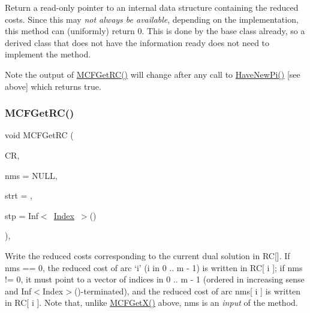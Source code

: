 Return a read-\/only pointer to an internal data structure containing the reduced costs. Since this may {\itshape not always be available}, depending on the implementation, this method can (uniformly) return 0. This is done by the base class already, so a derived class that does not have the information ready does not need to implement the method.

\begin{DoxyNote}{Note}
the output of \mbox{\hyperlink{class_m_c_f_class_af027cee8179a876a4879c73820c380d1}{M\+C\+F\+Get\+R\+C()}} will change after any call to \mbox{\hyperlink{class_m_c_f_class_a87b2b6516a7874ac55145312bd2d55bb}{Have\+New\+Pi()}} \mbox{[}see above\mbox{]} which returns true. 
\end{DoxyNote}
\mbox{\label{class_m_c_f_simplex_a9cc0f8dbc79bf2fd7744a6ad32b3e985}} 
\subsubsection{\texorpdfstring{M\+C\+F\+Get\+R\+C()}{MCFGetRC()}\hspace{0.1cm}{\footnotesize\ttfamily [4/5]}}
{\footnotesize\ttfamily void M\+C\+F\+Get\+RC (\begin{DoxyParamCaption}\item[{\mbox{\hyperlink{class_m_c_f_class_a62409402be4e4b301e1a568f99f877be}{C\+Row}}}]{CR,  }\item[{\mbox{\hyperlink{class_m_c_f_class_a81575b2d4e4d5636b17170432150ae69}{c\+Index\+\_\+\+Set}}}]{nms = {\ttfamily NULL},  }\item[{\mbox{\hyperlink{class_m_c_f_class_a76aaabb20535c51a2752b93f6c38fe54}{c\+Index}}}]{strt = {},  }\item[{\mbox{\hyperlink{class_m_c_f_class_ad53d6229d7ec28555a9c9c2fd9abf773}{Index}}}]{stp = {\ttfamily Inf$<$~\mbox{\hyperlink{class_m_c_f_class_ad53d6229d7ec28555a9c9c2fd9abf773}{Index}}~$>$()} }\end{DoxyParamCaption})\hspace{0.3cm}{\ttfamily [override]}, {\ttfamily [virtual]}}

Write the reduced costs corresponding to the current dual solution in RC\mbox{[}\mbox{]}. If nms == 0, the reduced cost of arc `i' (i in 0 .. m -\/ 1) is written in RC\mbox{[} i \mbox{]}; if nms != 0, it must point to a vector of indices in 0 .. m -\/ 1 (ordered in increasing sense and Inf$<$\+Index$>$()-\/terminated), and the reduced cost of arc nms\mbox{[} i \mbox{]} is written in RC\mbox{[} i \mbox{]}. Note that, unlike \mbox{\hyperlink{class_m_c_f_class_a4eb307e0707adaef99bb0e08c9e10eb8}{M\+C\+F\+Get\+X()}} above, nms is an {\itshape input} of the method.

